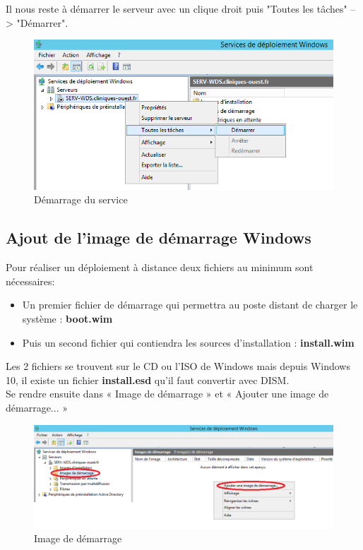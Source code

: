 \documentclass[11pt,a4paper,oneside]{article}
\begin{document}
Il nous reste à démarrer le serveur avec un clique droit puis "Toutes les tâches" --> "Démarrer".

\begin{figure}[hbtp]
\centering
\includegraphics[scale=0.7]{Pictures/Configuration/Conf7.png}
\caption{\label{etiquette} Démarrage du service}
\end{figure}
\newpage

\subsection{Ajout de l'image de démarrage Windows}
Pour réaliser un déploiement à distance deux fichiers au minimum sont nécessaires:

\begin{itemize}
\item Un premier fichier de démarrage qui permettra au poste distant de charger le système : \textbf{boot.wim}
\item  Puis un second fichier qui contiendra les sources d’installation : \textbf{install.wim} \\
\end{itemize}

Les 2 fichiers se trouvent sur le CD ou l'ISO de Windows mais depuis Windows 10, il existe un fichier \textbf{install.esd} qu'il faut convertir avec DISM. \\

Se rendre ensuite dans « Image de démarrage » et « Ajouter une image de démarrage... »
\begin{figure}[hbtp]
\centering
\includegraphics[scale=0.7]{Pictures/Configuration/Conf8.png}
\caption{\label{etiquette} Image de démarrage}
\end{figure}
\end{document}
